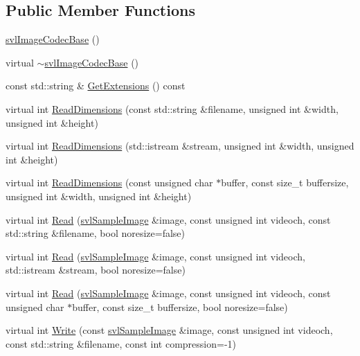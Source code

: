 \subsection*{Public Member Functions}
\begin{DoxyCompactItemize}
\item 
\hyperlink{classsvl_image_codec_base_a909f397a46b0463b4afb105794bf258b}{svl\-Image\-Codec\-Base} ()
\item 
virtual \hyperlink{classsvl_image_codec_base_a9fd6967c446e88334c7dcc3ca581fa1c}{$\sim$svl\-Image\-Codec\-Base} ()
\item 
const std\-::string \& \hyperlink{classsvl_image_codec_base_adc0bbac7a58bc226ec4b7af010a74c8b}{Get\-Extensions} () const 
\item 
virtual int \hyperlink{classsvl_image_codec_base_a09ece25672d72b88a74e7313637e7bdc}{Read\-Dimensions} (const std\-::string \&filename, unsigned int \&width, unsigned int \&height)
\item 
virtual int \hyperlink{classsvl_image_codec_base_a3e07f330df9b8f8f6ee213f6df1dd7f8}{Read\-Dimensions} (std\-::istream \&stream, unsigned int \&width, unsigned int \&height)
\item 
virtual int \hyperlink{classsvl_image_codec_base_a2ad505be3de1c3b3efbcc605e297926b}{Read\-Dimensions} (const unsigned char $\ast$buffer, const size\-\_\-t buffersize, unsigned int \&width, unsigned int \&height)
\item 
virtual int \hyperlink{classsvl_image_codec_base_ab9e440fe67e9d5d14b2df28fa5e35186}{Read} (\hyperlink{classsvl_sample_image}{svl\-Sample\-Image} \&image, const unsigned int videoch, const std\-::string \&filename, bool noresize=false)
\item 
virtual int \hyperlink{classsvl_image_codec_base_a1f35cfa4d4642eb19e8a1dac4b171f97}{Read} (\hyperlink{classsvl_sample_image}{svl\-Sample\-Image} \&image, const unsigned int videoch, std\-::istream \&stream, bool noresize=false)
\item 
virtual int \hyperlink{classsvl_image_codec_base_ac6bb4ca4f51e383e86a700cd64a1cff8}{Read} (\hyperlink{classsvl_sample_image}{svl\-Sample\-Image} \&image, const unsigned int videoch, const unsigned char $\ast$buffer, const size\-\_\-t buffersize, bool noresize=false)
\item 
virtual int \hyperlink{classsvl_image_codec_base_a1a8e5f0b4386b0c1608ee72af48751cc}{Write} (const \hyperlink{classsvl_sample_image}{svl\-Sample\-Image} \&image, const unsigned int videoch, const std\-::string \&filename, const int compression=-\/1)

\end{DoxyCompactItemize}
